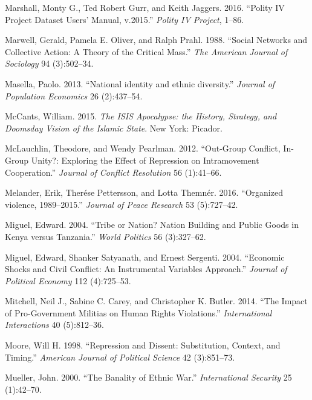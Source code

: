 \documentclass[12pt,]{book}
\theoremstyle{definition}
\theoremstyle{definition}
\theoremstyle{definition}
\theoremstyle{remark}
\begin{document}
\leavevmode\hypertarget{ref-Marshall2016}{}%
Marshall, Monty G., Ted Robert Gurr, and Keith Jaggers. 2016. ``Polity
IV Project Dataset Users' Manual, v.2015.'' \emph{Polity IV Project},
1--86.

\leavevmode\hypertarget{ref-Marwell1988}{}%
Marwell, Gerald, Pamela E. Oliver, and Ralph Prahl. 1988. ``Social
Networks and Collective Action: A Theory of the Critical Mass.''
\emph{The American Journal of Sociology} 94 (3):502--34.

\leavevmode\hypertarget{ref-Masella2013}{}%
Masella, Paolo. 2013. ``National identity and ethnic diversity.''
\emph{Journal of Population Economics} 26 (2):437--54.

\leavevmode\hypertarget{ref-McCants2015}{}%
McCants, William. 2015. \emph{The ISIS Apocalypse: the History,
Strategy, and Doomsday Vision of the Islamic State}. New York: Picador.

\leavevmode\hypertarget{ref-McLauchlin2012}{}%
McLauchlin, Theodore, and Wendy Pearlman. 2012. ``Out-Group Conflict,
In-Group Unity?: Exploring the Effect of Repression on Intramovement
Cooperation.'' \emph{Journal of Conflict Resolution} 56 (1):41--66.

\leavevmode\hypertarget{ref-Melander2016}{}%
Melander, Erik, Therése Pettersson, and Lotta Themnér. 2016. ``Organized
violence, 1989--2015.'' \emph{Journal of Peace Research} 53 (5):727--42.

\leavevmode\hypertarget{ref-Miguel2004b}{}%
Miguel, Edward. 2004. ``Tribe or Nation? Nation Building and Public
Goods in Kenya versus Tanzania.'' \emph{World Politics} 56 (3):327--62.

\leavevmode\hypertarget{ref-Miguel2004a}{}%
Miguel, Edward, Shanker Satyanath, and Ernest Sergenti. 2004. ``Economic
Shocks and Civil Conflict: An Instrumental Variables Approach.''
\emph{Journal of Political Economy} 112 (4):725--53.

\leavevmode\hypertarget{ref-Mitchell2014}{}%
Mitchell, Neil J., Sabine C. Carey, and Christopher K. Butler. 2014.
``The Impact of Pro-Government Militias on Human Rights Violations.''
\emph{International Interactions} 40 (5):812--36.

\leavevmode\hypertarget{ref-Moore1998}{}%
Moore, Will H. 1998. ``Repression and Dissent: Substitution, Context,
and Timing.'' \emph{American Journal of Political Science} 42
(3):851--73.

\leavevmode\hypertarget{ref-mueller00}{}%
Mueller, John. 2000. ``The Banality of Ethnic War.'' \emph{International
Security} 25 (1):42--70.
\end{document}
